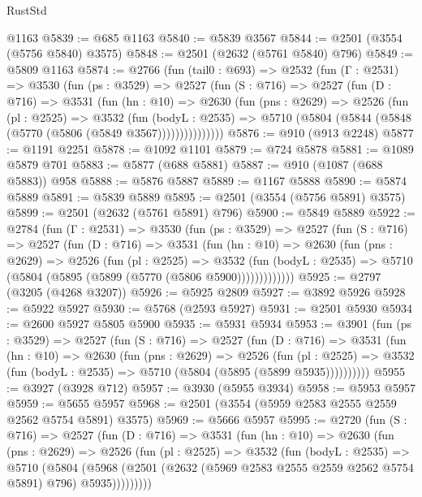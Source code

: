 \begin{lexlean}{RustStd}
\begin{coremodule}
{\begin{coremodule}
{{{{{{{{{{{{{{{{{{{{    @1163
@5839 := @685 @1163
@5840 := @5839 @3567
@5844 := @2501 (@3554 (@5756 @5840) @3575)
@5848 := @2501 (@2632 (@5761 @5840) @796)
@5849 := @5809 @1163
@5874 := @2766
    (fun (tail0 : @693) =>
    @2532
      (fun (Γ : @2531) =>
      @3530
        (fun (ps : @3529) =>
        @2527
          (fun (S : @716) =>
          @2527
            (fun (D : @716) =>
            @3531
              (fun (hn : @10) =>
              @2630
                (fun (pns : @2629) =>
                @2526
                  (fun (pl : @2525) =>
                  @3532
                    (fun (bodyL : @2535) =>
                    @5710 (@5804 (@5844 (@5848 (@5770 (@5806 (@5849 @3567)))))))))))))))
@5876 := @910 (@913 @2248)
@5877 := @1191 @2251
@5878 := @1092 @1101
@5879 := @724 @5878
@5881 := @1089 @5879 @701
@5883 := @5877 (@688 @5881)
@5887 := @910 (@1087 (@688 @5883)) @958
@5888 := @5876 @5887
@5889 := @1167 @5888
@5890 := @5874 @5889
@5891 := @5839 @5889
@5895 := @2501 (@3554 (@5756 @5891) @3575)
@5899 := @2501 (@2632 (@5761 @5891) @796)
@5900 := @5849 @5889
@5922 := @2784
    (fun (Γ : @2531) =>
    @3530
      (fun (ps : @3529) =>
      @2527
        (fun (S : @716) =>
        @2527
          (fun (D : @716) =>
          @3531
            (fun (hn : @10) =>
            @2630
              (fun (pns : @2629) =>
              @2526
                (fun (pl : @2525) =>
                @3532
                  (fun (bodyL : @2535) =>
                  @5710 (@5804 (@5895 (@5899 (@5770 (@5806 @5900)))))))))))))
@5925 := @2797 (@3205 (@4268 @3207))
@5926 := @5925 @2809
@5927 := @3892 @5926
@5928 := @5922 @5927
@5930 := @5768 (@2593 @5927)
@5931 := @2501 @5930
@5934 := @2600 @5927 @5805 @5900
@5935 := @5931 @5934
@5953 := @3901
    (fun (ps : @3529) =>
    @2527
      (fun (S : @716) =>
      @2527
        (fun (D : @716) =>
        @3531
          (fun (hn : @10) =>
          @2630
            (fun (pns : @2629) =>
            @2526
              (fun (pl : @2525) =>
              @3532 (fun (bodyL : @2535) => @5710 (@5804 (@5895 (@5899 @5935))))))))))
@5955 := @3927 (@3928 @712)
@5957 := @3930 (@5955 @3934)
@5958 := @5953 @5957
@5959 := @5655 @5957
@5968 := @2501 (@3554 (@5959 @2583 @2555 @2559 @2562 @5754 @5891) @3575)
@5969 := @5666 @5957
@5995 := @2720
    (fun (S : @716) =>
    @2527
      (fun (D : @716) =>
      @3531
        (fun (hn : @10) =>
        @2630
          (fun (pns : @2629) =>
          @2526
            (fun (pl : @2525) =>
            @3532
              (fun (bodyL : @2535) =>
              @5710
                (@5804
                  (@5968
                    (@2501 (@2632 (@5969 @2583 @2555 @2559 @2562 @5754 @5891) @796) @5935)))))))))
}}}}}}}}}}}}}}}}}}}}
\end{coremodule}}
\end{coremodule}
\end{lexlean}
